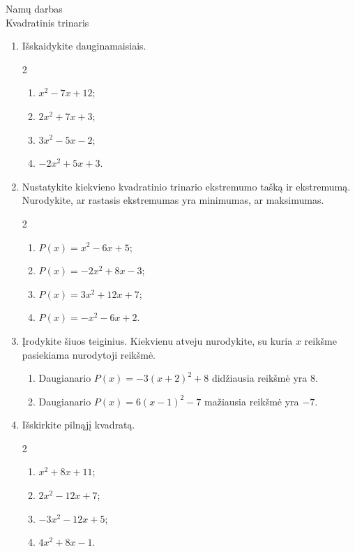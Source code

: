 \documentclass[12pt,a4paper]{article}
\begin{document}
\begin{center}
  {\Large Namų darbas}\\[4pt]
  {\large Kvadratinis trinaris}
\end{center}

\begin{enumerate}
\item Išskaidykite dauginamaisiais.
\begin{multicols}{2}
\begin{enumerate}
  \item $x^2-7x+12$;
  \item $2x^2+7x+3$;
  \item $3x^2-5x-2$;
  \item $-2x^2+5x+3$.
\end{enumerate}
\end{multicols}

\item Nustatykite kiekvieno kvadratinio trinario ekstremumo tašką ir ekstremumą. Nurodykite, ar rastasis ekstremumas yra minimumas, ar maksimumas.
\begin{multicols}{2}
\begin{enumerate}
  \item $P(x)=x^2-6x+5$;
  \item $P(x)=-2x^2+8x-3$;
  \item $P(x)=3x^2+12x+7$;
  \item $P(x)=-x^2-6x+2$.
\end{enumerate}
\end{multicols}

\item Įrodykite šiuos teiginius. Kiekvienu atveju nurodykite, su kuria $x$ reikšme pasiekiama nurodytoji reikšmė.
\begin{enumerate}
  \item Daugianario $P(x)=-3(x+2)^2+8$ didžiausia reikšmė yra $8$.
  \item Daugianario $P(x)=6(x-1)^2-7$ mažiausia reikšmė yra $-7$.
\end{enumerate}

\item Išskirkite pilnąjį kvadratą.
\begin{multicols}{2}
\begin{enumerate}
  \item $x^2+8x+11$;
  \item $2x^2-12x+7$;
  \item $-3x^2-12x+5$;
  \item $4x^2+8x-1$.
\end{enumerate}
\end{multicols}


\end{enumerate}
\end{document}
